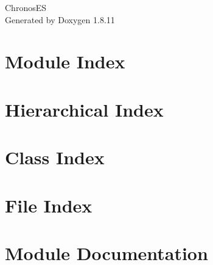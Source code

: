 \documentclass[twoside]{book}
\newcommand{\+}{\discretionary{\mbox{\scriptsize$\hookleftarrow$}}{}{}}
\newcommand{\clearemptydoublepage}{%
  \newpage{\pagestyle{empty}\cleardoublepage}%
}
\begin{document}
\hypersetup{pageanchor=false,
             bookmarksnumbered=true,
             pdfencoding=unicode
            }
\begin{titlepage}
\vspace*{7cm}
\begin{center}%
{\Large Chronos\+ES }\\
\vspace*{1cm}
{\large Generated by Doxygen 1.8.11}\\
\end{center}
\end{titlepage}
\clearemptydoublepage
\tableofcontents
\clearemptydoublepage
{}
\hypersetup{pageanchor=true}

\chapter{Module Index}

\chapter{Hierarchical Index}

\chapter{Class Index}

\chapter{File Index}

\chapter{Module Documentation}


\end{document}
